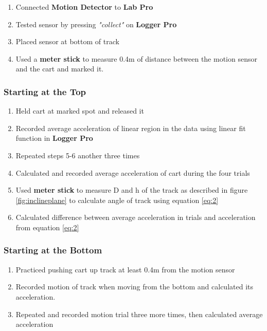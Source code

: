 \documentclass[a4paper,12pt]{article}
\begin{document}
	\begin{enumerate}
		\item Connected \textbf{Motion Detector} to \textbf{Lab Pro} 
		\item Tested sensor by pressing \textit{"collect"} on \textbf{Logger Pro}
		\item Placed sensor at bottom of track
		\item Used a \textbf{meter stick} to measure 0.4\thinspace m of distance between the motion sensor and the cart and marked it.
	\end{enumerate}

\subsubsection{Starting at the Top}

	\begin{enumerate}[resume]

	\item Held cart at marked spot and released it
	\item Recorded average acceleration of linear region in the data using linear fit function in \textbf{Logger Pro}
	\item Repeated steps 5-6 another three times 
	\item Calculated and recorded average acceleration of cart during the four trials
	\item Used \textbf{meter stick} to measure D and h of the track as described in figure \ref{fig:inclineplane} to calculate angle of track using equation \eqref{eq:2}
	\item Calculated difference between average acceleration in trials and acceleration from equation \eqref{eq:2}
	\end{enumerate}

	\subsubsection{Starting at the Bottom}

	\begin{enumerate}[resume]
			\item Practiced pushing cart up track at least 0.4\thinspace m from the motion sensor
			\item Recorded motion of track when moving from the bottom and calculated its acceleration.
			\item Repeated and recorded motion trial three more times, then calculated average acceleration
		\end{enumerate}
\end{document}

